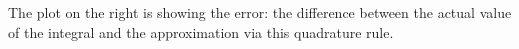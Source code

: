 \documentclass[12pt,letterpaper,noanswers]{exam}
\begin{document}
The plot on the right is showing the error: the difference between the actual value of the integral and the approximation via this quadrature rule.









\end{document}
